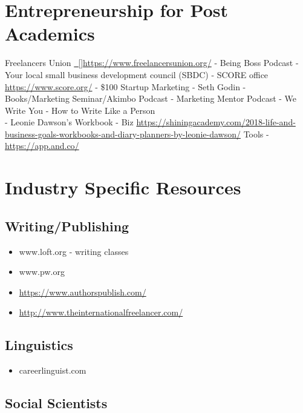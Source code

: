 \documentclass[]{book}
\providecommand{\tightlist}{%
  \setlength{\itemsep}{0pt}\setlength{\parskip}{0pt}}
\begin{document}
\chapter{Entrepreneurship for Post
Academics}\label{entrepreneurship-for-post-academics}

Freelancers Union
\href{https://www.freelancersunion.org/}{~{[}{]}https://www.freelancersunion.org/}
- Being Boss Podcast - Your local small business development council
(SBDC) - SCORE office \url{https://www.score.org/} - \$100 Startup
Marketing - Seth Godin - Books/Marketing Seminar/Akimbo Podcast -
Marketing Mentor Podcast - We Write You - How to Write Like a Person\\
- Leonie Dawson's Workbook - Biz
\url{https://shiningacademy.com/2018-life-and-business-goals-workbooks-and-diary-planners-by-leonie-dawson/}
Tools - \url{https://app.and.co/}

\chapter{Industry Specific Resources}\label{industry-specific-resources}

\section{Writing/Publishing}\label{writingpublishing}

\begin{itemize}
\tightlist
\item
  www.loft.org - writing classes
\item
  www.pw.org
\item
  \url{https://www.authorspublish.com/}
\item
  \url{http://www.theinternationalfreelancer.com/}
\end{itemize}

\section{Linguistics}\label{linguistics}

\begin{itemize}
\tightlist
\item
  careerlinguist.com
\end{itemize}

\section{Social Scientists}\label{social-scientists}
\end{document}
